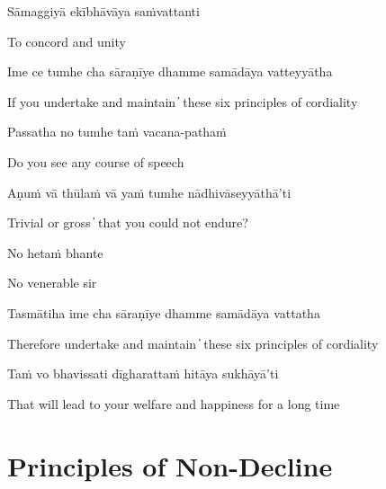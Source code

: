 Sāmaggiyā ekībhāvāya saṁvattanti

\begin{cprenglish}
  To concord and unity
\end{cprenglish}


Ime ce tumhe cha sāraṇīye dhamme samādāya vatteyyātha

\begin{cprenglish}
  If you undertake and maintain  ̓  these six principles of cordiality
\end{cprenglish}

Passatha no tumhe taṁ vacana-pathaṁ

\begin{cprenglish}
  Do you see any course of speech
\end{cprenglish}

Aṇuṁ vā thūlaṁ vā yaṁ tumhe nādhivāseyyāthā’ti

\begin{cprenglish}
  Trivial or gross  ̓  that you could not endure?
\end{cprenglish}

No hetaṁ bhante

\begin{cprenglish}
  No venerable sir
\end{cprenglish}

Tasmātiha ime cha sāraṇīye dhamme samādāya vattatha

\begin{cprenglish}
  Therefore undertake and maintain  ̓  these six principles of cordiality
\end{cprenglish}

Taṁ vo bhavissati dīgharattaṁ hitāya sukhāyā’ti

\begin{cprenglish}
  That will lead to your welfare and happiness for a long time
\end{cprenglish}


\clearpage

\section{Principles of Non-Decline}

\begin{leader}
\end{leader}


